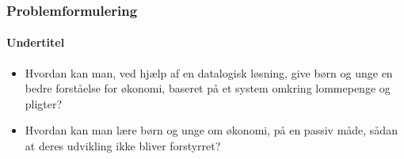 
\begin{frame}
\frametitle{Problemformulering}
\framesubtitle{Undertitel} %
    \begin{itemize}
        \item{Hvordan kan man, ved hjælp af en datalogisk løsning, give børn og unge en bedre forståelse for økonomi, baseret på et system omkring lommepenge og pligter?}
        \pause
        \item{Hvordan kan man lære børn og unge om økonomi, på en passiv måde, sådan at deres udvikling ikke bliver forstyrret?}
    \end{itemize}
\end{frame}
   

